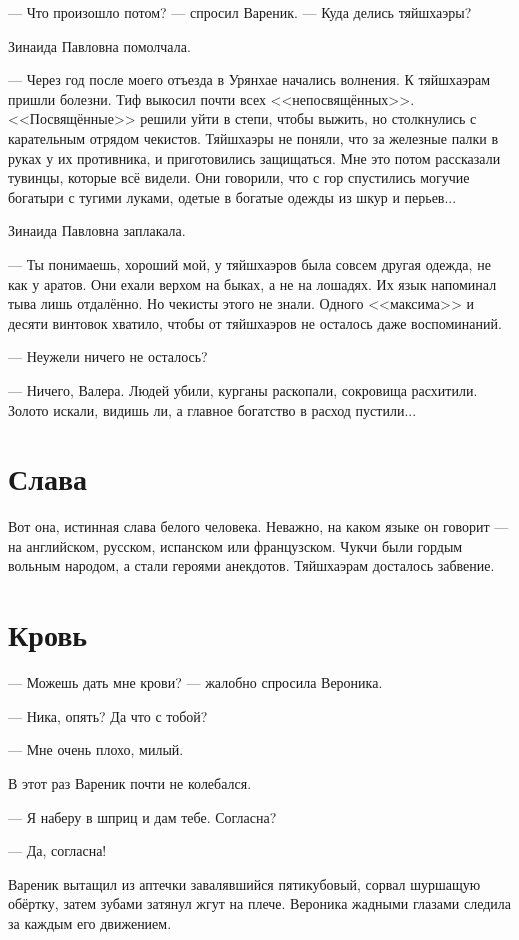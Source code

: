 \documentclass[a4paper,10pt,fleqn]{book}\usepackage{polyglossia}\setdefaultlanguage{english}\setotherlanguage{russian}\defaultfontfeatures{Ligatures=TeX,Mapping=tex-text} \usepackage{xcolor}\definecolor{lightgray}{HTML}{bbbbbb}\color{lightgray}\newcommand{\ml}[3]{\textcolor{black}{#3}}
\begin{document}
--- Что произошло потом? --- спросил Вареник.
--- Куда делись тяйшхаэры?

Зинаида Павловна помолчала.

--- Через год после моего отъезда в Урянхае начались волнения.
К тяйшхаэрам пришли болезни.
Тиф выкосил почти всех <<непосвящённых>>.
<<Посвящённые>> решили уйти в степи, чтобы выжить, но столкнулись с карательным отрядом чекистов.
Тяйшхаэры не поняли, что за железные палки в руках у их противника, и приготовились защищаться.
Мне это потом рассказали тувинцы, которые всё видели.
Они говорили, что с гор спустились могучие богатыри с тугими луками, одетые в богатые одежды из шкур и перьев...

Зинаида Павловна заплакала.

--- Ты понимаешь, хороший мой, у тяйшхаэров была совсем другая одежда, не как у аратов.
Они ехали верхом на быках, а не на лошадях.
Их язык напоминал тыва лишь отдалённо.
Но чекисты этого не знали.
Одного <<максима>> и десяти винтовок хватило, чтобы от тяйшхаэров не осталось даже воспоминаний.

--- Неужели ничего не осталось?

--- Ничего, Валера.
Людей убили, курганы раскопали, сокровища расхитили.
Золото искали, видишь ли, а главное богатство в расход пустили...

\section{Слава}

Вот она, истинная слава белого человека.
Неважно, на каком языке он говорит --- на английском, русском, испанском или французском.
Чукчи были гордым вольным народом, а стали героями анекдотов.
Тяйшхаэрам досталось забвение.

\section{Кровь}

--- Можешь дать мне крови? --- жалобно спросила Вероника.

--- Ника, опять?
Да что с тобой?

--- Мне очень плохо, милый.

В этот раз Вареник почти не колебался.

--- Я наберу в шприц и дам тебе.
Согласна?

--- Да, согласна!

Вареник вытащил из аптечки завалявшийся пятикубовый, сорвал шуршащую обёртку, затем зубами затянул жгут на плече.
Вероника жадными глазами следила за каждым его движением.
\end{document}
